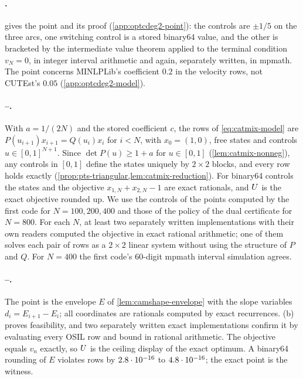 \paragraph{.}
 gives the point and its proof (\cref{app:optcdeg2-point}): the controls are $\pm1/5$ on the three arcs, one switching control is a stored binary64 value, and the other is bracketed by the intermediate value theorem applied to the terminal condition $v_N=0$, in integer interval arithmetic and again, separately written, in mpmath.
The point concerns MINLPLib's coefficient $0.2$ in the velocity rows, not CUTEst's $0.05$ (\cref{app:optcdeg2-model}).

\paragraph{--.}
With $a=1/(2N)$ and the stored coefficient $c$, the rows of \eqref{eq:catmix-model} are $P(u_{i+1})x_{i+1}=Q(u_i)x_i$ for $i<N$, with $x_0=(1,0)$, free states and controls $u\in[0,1]^{N+1}$.
Since $\det P(u)\ge1+a$ for $u\in[0,1]$ (\cref{lem:catmix-nonneg}), any controls in $[0,1]$ define the states uniquely by $2\times2$ blocks, and every row holds exactly (\cref{prop:pts-triangular,lem:catmix-reduction}).
For binary64 controls the states and the objective $x_{1,N}+x_{2,N}-1$ are exact rationals, and $U$ is the exact objective rounded up.
We use the controls of the points computed by the first code for $N=100,200,400$ and those of the policy of the dual certificate for $N=800$.
For each $N$, at least two separately written implementations with their own readers computed the objective in exact rational arithmetic; one of them solves each pair of rows as a $2\times2$ linear system without using the structure of $P$ and $Q$.
For $N=400$ the first code's 60-digit mpmath interval simulation agrees.

\paragraph{--.}
The point is the envelope $E$ of \cref{lem:camshape-envelope} with the slope variables $d_i=E_{i+1}-E_i$; all coordinates are rationals computed by exact recurrences.
(b) proves feasibility, and two separately written exact implementations confirm it by evaluating every OSIL row and bound in rational arithmetic.
The objective equals $v_n$ exactly, so $U$ is the ceiling display of the exact optimum.
A binary64 rounding of $E$ violates rows by $2.8\cdot 10^{-16}$ to $4.8\cdot 10^{-16}$; the exact point is the witness.

